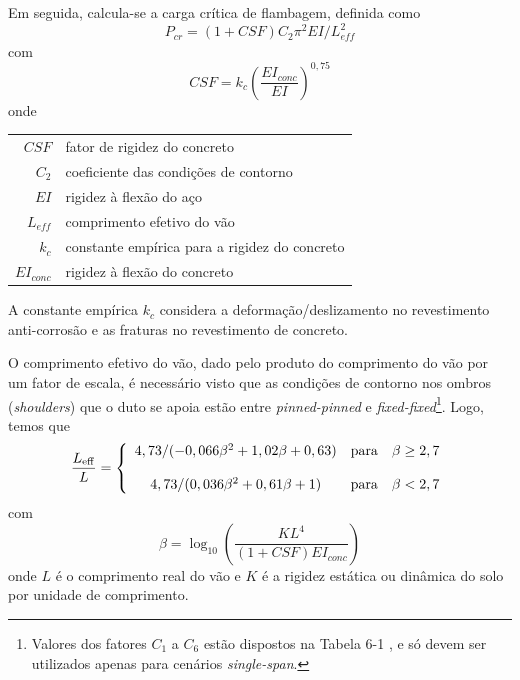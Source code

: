 Em seguida, calcula-se a carga crítica de flambagem, definida como
\begin{equation}
\label{eq:viv-Pcr}
P_\mathit{cr} = (1 + \mathit{CSF}) C_2\pi^2 \mathit{EI}/L_\mathit{eff}^2
\end{equation}
com
\begin{equation}
\label{eq:viv-CSF}
\mathit{CSF} = k_c  \left(\frac{\mathit{EI}_\mathit{conc}}{\mathit{EI}}\right)^{0,75}
\end{equation}
onde

\begin{tabular}{rl}
	$\mathit{CSF}$               & fator de rigidez do concreto\\
	$C_2$                        & coeficiente das condições de contorno\\
	$\mathit{EI}$                & rigidez à flexão do aço\\
	$L_\mathit{eff}$             & comprimento efetivo do vão\\
	$k_c$                        & constante empírica para a rigidez do concreto\\
	$\mathit{EI}_\mathit{conc}$  & rigidez à flexão do concreto
\end{tabular}

A constante empírica $k_c$ considera a deformação/deslizamento no revestimento anti-corrosão e as fraturas no revestimento de concreto.

O comprimento efetivo do vão, dado pelo produto do comprimento do vão por um fator de escala, é necessário visto que as condições de contorno nos ombros (\textit{shoulders}) que o duto se apoia estão entre \textit{pinned-pinned} e \textit{fixed-fixed}\footnote{Valores dos fatores $C_1$ a $C_6$ estão dispostos na Tabela 6-1 \cite[p. 111]{DNV2017}, e só devem ser utilizados apenas para cenários \textit{single-span}.}.
Logo, temos que
\begin{equation}
\label{eq:viv-LeffL}
\frac{L_\mathrm{eff}}{L} =
\left\{
\begin{array}{c c c}
	4,73 / (-0,066 \beta^2 + 1,02 \beta + 0,63)   & \mathrm{para} & \beta \geq 2,7 \\
	\\
	4,73 / (0,036 \beta^2 + 0,61 \beta + 1)       & \mathrm{para} & \beta <    2,7
\end{array}
\right.
\end{equation}
com
\begin{equation}
\label{eq:viv-beta}
\beta = \log_{10}\left( \frac{K L^4}{(1 + \mathit{CSF})\mathit{EI}_\mathit{conc}} \right)
\end{equation}
onde $L$ é o comprimento real do vão e $K$ é a rigidez estática ou dinâmica do solo por unidade de comprimento.

